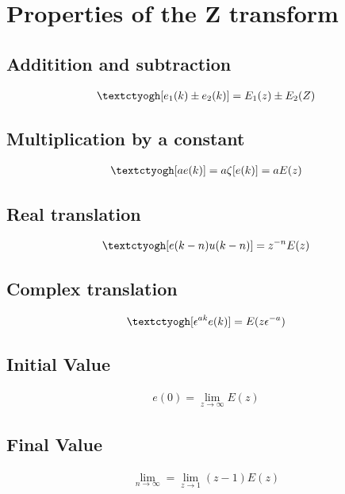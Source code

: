 \documentclass{report}
\begin{document}
\section{Properties of the Z transform}
\label{sub:Properties of the Z transform}
\subsection{Additition and subtraction}
\begin{align*}
	\text{\textctyogh}[e_1(k) \pm e_2(k)] = E_1(z) \pm E_2(Z)\\
\end{align*}
\subsection{Multiplication by a constant}
\begin{align*}
	\text{\textctyogh}[ae(k)] = a\zeta[e(k)] = aE(z)\\
\end{align*}
\subsection{Real translation}
\begin{align*}
	\text{\textctyogh}[e(k-n)u(k-n)] = z^{-n} E(z)\\
\end{align*}
\subsection{Complex translation}
\begin{align*}
	\text{\textctyogh}[\epsilon^{ak}e(k)] = E(z\epsilon^{-a})
\end{align*}
\subsection{Initial Value}
\begin{align*}
	e(0) = \lim_{z \to \infty}E(z)
\end{align*}
\subsection{Final Value}
\begin{align*}
	\lim_{n \to \infty} = \lim_{z \to 1}(z-1)E(z)
\end{align*}



\end{document}
